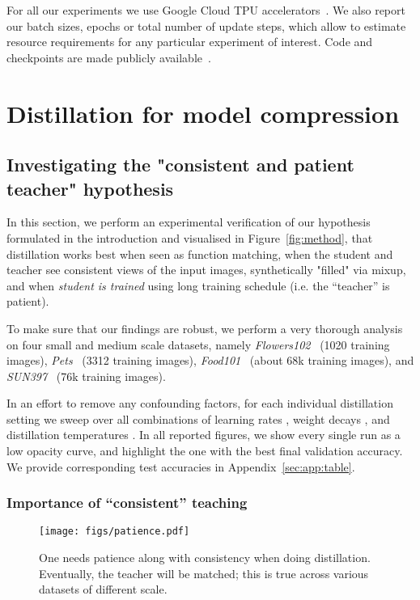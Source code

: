 \documentclass[10pt,twocolumn,letterpaper]{article}
\begin{document}
For all our experiments we use Google Cloud TPU accelerators~\cite{jouppi2017datacenter}. We also report our batch sizes, epochs or total number of update steps, which allow to estimate resource requirements for any particular experiment of interest. Code and checkpoints are made publicly available~\cite{big_vision}.

\section{Distillation for model compression}\label{sec:exp}


\subsection{Investigating the "consistent and patient teacher" hypothesis}
\label{sec:hpsweep}

In this section, we perform an experimental verification of our hypothesis formulated in the introduction and visualised in Figure~\ref{fig:method}, 
 that distillation works best when seen as function matching, \ie when the  student and teacher see consistent views of the input images, synthetically "filled" via mixup, and when \emph{student is trained} using long training schedule (i.e. the ``teacher'' is patient).

To make sure that our findings are robust, we perform a very thorough analysis on four small and medium scale datasets, namely \emph{Flowers102}~\cite{dataflowers} (1020 training images), \emph{Pets}~\cite{datapets} (3312 training images), \emph{Food101}~\cite{datafood} (about 68k training images), and \emph{SUN397}~\cite{datasun} (76k training images).

In an effort to remove any confounding factors, for each individual distillation setting we sweep over all combinations of learning rates , weight decays , and distillation temperatures .
In all reported figures, we show every single run as a low opacity curve, and highlight the one with the best final validation accuracy.
We provide corresponding test accuracies in Appendix~\ref{sec:app:table}.

\subsubsection{Importance of ``consistent'' teaching}
\label{sec:designchoices}

\begin{figure*}[t]\centering
    \texttt{[image: figs/patience.pdf]}\caption{One needs patience along with consistency when doing distillation. Eventually, the teacher will be matched; this is true across various datasets of different scale.}
    \label{fig:patience}\end{figure*}
\end{document}
